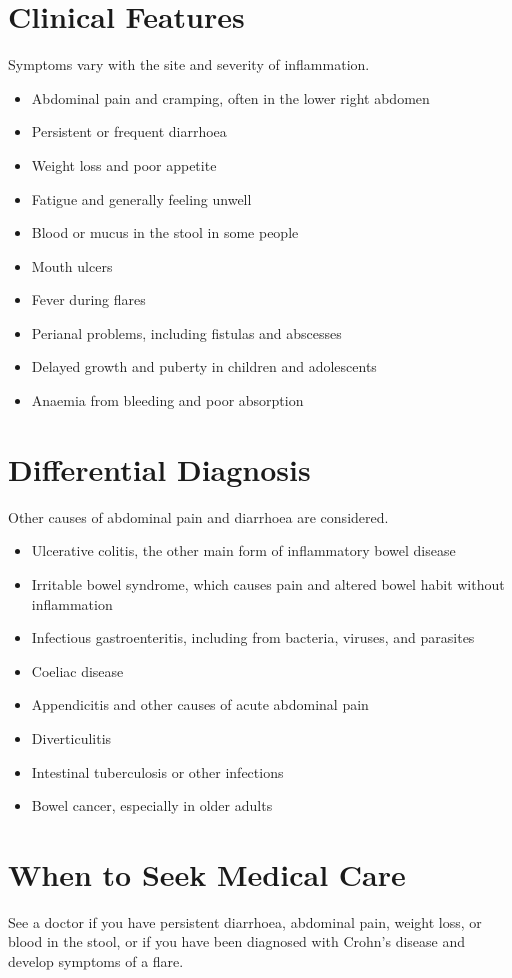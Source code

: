 \section*{Clinical Features}
Symptoms vary with the site and severity of inflammation.

\begin{itemize}
    \item Abdominal pain and cramping, often in the lower right abdomen
    \item Persistent or frequent diarrhoea
    \item Weight loss and poor appetite
    \item Fatigue and generally feeling unwell
    \item Blood or mucus in the stool in some people
    \item Mouth ulcers
    \item Fever during flares
    \item Perianal problems, including fistulas and abscesses
    \item Delayed growth and puberty in children and adolescents
    \item Anaemia from bleeding and poor absorption
\end{itemize}

\section*{Differential Diagnosis}
Other causes of abdominal pain and diarrhoea are considered.

\begin{itemize}
    \item Ulcerative colitis, the other main form of inflammatory bowel disease
    \item Irritable bowel syndrome, which causes pain and altered bowel habit without inflammation
    \item Infectious gastroenteritis, including from bacteria, viruses, and parasites
    \item Coeliac disease
    \item Appendicitis and other causes of acute abdominal pain
    \item Diverticulitis
    \item Intestinal tuberculosis or other infections
    \item Bowel cancer, especially in older adults
\end{itemize}

\section*{When to Seek Medical Care}
See a doctor if you have persistent diarrhoea, abdominal pain, weight loss, or blood in the stool, or if you have been diagnosed with Crohn's disease and develop symptoms of a flare.


